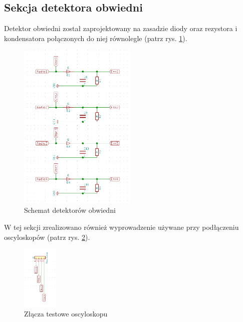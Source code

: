\documentclass[eng,printmode]{mgr}
\begin{document}
\subsection{Sekcja detektora obwiedni}
Detektor obwiedni został zaprojektowany na zasadzie diody oraz rezystora i kondensatora połączonych do niej równolegle (patrz rys. \ref{fig-detektory}).
\begin{figure}[ht]

    \centering

  \includegraphics[width=0.5\textwidth, angle=0]{detektory.png}

    \caption{Schemat detektorów obwiedni}
 \label{fig-detektory}
    

\end{figure}

W tej sekcji zrealizowano również wyprowadzenie używane przy podłączeniu oscyloskopów (patrz rys. \ref{fig-oscyloskop}).
\begin{figure}[ht]

    \centering

  \includegraphics[width=0.15\textwidth, angle=0]{oscyloskop.png}

    \caption{Złącza testowe oscyloskopu}
 \label{fig-oscyloskop}
    

\end{figure}
\newpage
\end{document}
